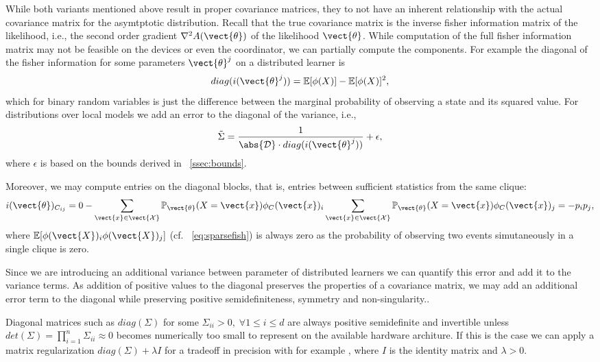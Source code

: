 While both variants mentioned above result in proper covariance matrices, they to not have an inherent relationship with the actual covariance matrix for the asymtptotic distribution.
Recall that the true covariance matrix is the inverse fisher information matrix of the likelihood, i.e., the second order gradient $\nabla^2 A(\vect{\theta})$ of the likelihood \wrt $\vect{\theta}$.
While computation of the full fisher information matrix may not be feasible on the devices or even the coordinator, we can partially compute the components. 
For example the diagonal of the fisher information for some parameters $\vect{\theta}^j$ on a distributed learner is 
\begin{equation}
    diag(i(\vect{\theta}^j)) = \mathbb{E}[\phi(X)] - \mathbb{E}[\phi(X)]^2,
\end{equation}
which for binary random variables is just the difference between the marginal probability of observing a state and its squared value.
For distributions over local models we add an error to the diagonal of the variance, i.e.,
\begin{equation}
    \tilde{\Sigma}=  \frac{1}{\abs{\mathcal{D}} \cdot diag(i(\vect{\theta}^j))} + \epsilon,
\end{equation}
where $\epsilon$ is based on the bounds derived in \sect~\ref{ssec:bounds}.

Moreover, we may compute entries on the diagonal blocks, that is, entries between sufficient statistics from the same clique:
\begin{equation}
    i(\vect{\theta})_{C_{ij}} = 0- \sum_{\vect{x} \in \vect{\mathcal{X}}} \mathbb{P}_{\vect{\theta}}(X= \vect{x}) \phi_C(\vect{x})_i \sum_{\vect{x} \in \vect{\mathcal{X}}} \mathbb{P}_{\vect{\theta}}(X= \vect{x}) \phi_C(\vect{x})_j= - p_i p_j,
\end{equation}
where $ \mathbb{E}[\phi(\vect{X})_i \phi(\vect{X})_j]$ (cf. \eq~\ref{eq:sparsefish}) is always zero as the probability of observing two events simutaneously in a single clique is zero.

Since we are introducing an additional variance between parameter of distributed learners we can quantify this error and add it to the variance terms.
As addition of positive values to the diagonal preserves the properties of a covariance matrix, we may add an additional error term to the diagonal while preserving positive semidefiniteness, symmetry and non-singularity..

Diagonal matrices such as $diag(\Sigma)$ for some $\Sigma_{ii} > 0, \; \forall 1 \leq i \leq d$ are always positive semidefinite and invertible unless $det(\Sigma) = \prod_{i=1}^n \Sigma_{ii} \approx 0$ becomes numerically too small to represent on the available hardware architure. 
If this is the case we can apply a matrix regularization $diag(\Sigma) + \lambda I$ for a tradeoff in precision with for example , where $I$ is the identity matrix and $\lambda > 0$.

